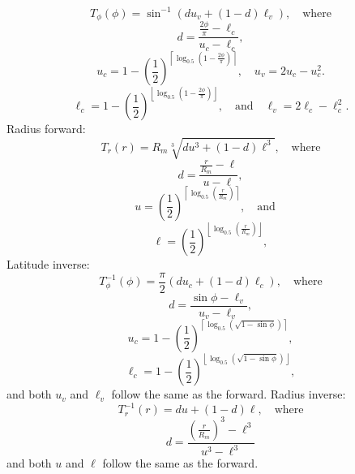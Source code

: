 %
\begin{equation*}
T_{\phi}(\phi) = \sin^{-1} \left( d u_{v} + \left( 1 - d \right) \ell_{v} \right), \quad \text{where}
\end{equation*}
%
\begin{equation*}
d = \frac{\frac{2\phi}{\pi} - \ell_{c}}{u_{c} - \ell_{c}},
\end{equation*}
%
\begin{equation*}
u_{c} = 1 - \left( \frac{1}{2} \right)^{ \left\lceil \log_{0.5} \left( 1 - \frac{2\phi}{\pi} \right) \right\rceil }, \quad u_{v} = 2 u_{c} - u_{c}^{2}.
\end{equation*}
%
\begin{equation*}
\ell_{c} = 1 - \left( \frac{1}{2} \right)^{ \left\lfloor \log_{0.5} \left( 1 - \frac{2\phi}{\pi} \right) \right\rfloor }, \quad \text{and} \quad \ell_{v} = 2 \ell_{c} - \ell_{c}^{2}.
\end{equation*}
%
%
Radius forward:
%
\begin{equation*}
T_{r}(r) = R_{m} \sqrt[3]{ d u^{3} + \left( 1 - d \right) \ell^{3} }, \quad \text{where}
\end{equation*}
%
\begin{equation*}
d = \frac{\frac{r}{R_{m}} - \ell}{u - \ell},
\end{equation*}
%
\begin{equation*}
u = \left( \frac{1}{2} \right)^{ \left\lceil \log_{0.5} \left( \frac{r}{R_{m}} \right) \right\rceil }, \quad \text{and} \quad
\end{equation*}
%
\begin{equation*}
\ell = \left( \frac{1}{2} \right)^{ \left\lfloor \log_{0.5} \left( \frac{r}{R_{m}} \right) \right\rfloor } ,
\end{equation*}
%
%
%
Latitude inverse:
%
\begin{equation*}
T^{-1}_{\phi}(\phi) = \frac{\pi}{2} \left( d u_{c} + \left( 1 - d \right) \ell_{c} \right), \quad \text{where}
\end{equation*}
%
\begin{equation*}
d = \frac{\sin \phi - \ell_{v}}{u_{v} - \ell_{v}},
\end{equation*}
%
\begin{equation*}
u_{c} = 1 - \left( \frac{1}{2} \right)^{ \left\lceil \log_{0.5} \left( \sqrt{1 - \sin \phi} \right) \right\rceil },
\end{equation*}
%
\begin{equation*}
\ell_{c} = 1 - \left( \frac{1}{2} \right)^{ \left\lfloor \log_{0.5} \left( \sqrt{1 - \sin \phi} \right) \right\rfloor },
\end{equation*}
%
%
and both $u_{v}$ and $\ell_{v}$ follow the same as the forward. Radius inverse:
%
\begin{equation*}
T^{-1}_{r}(r) = d u + \left( 1 - d \right) \ell, \quad \text{where}
\end{equation*}
%
\begin{equation*}
d = \frac{ \left( \frac{r}{R_{m}} \right)^{3} - \ell^{3}}{u^{3} - \ell^{3}}
\end{equation*}
%
and both $u$ and $\ell$ follow the same as the forward.

